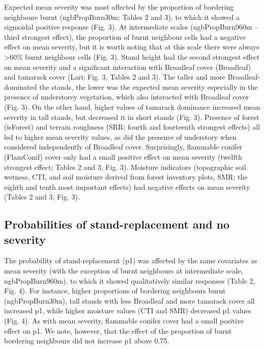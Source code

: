 \documentclass[
  numafflabel,
  authoryear,
  preprint]{elsarticle}
\begin{document}
Expected mean severity was most affected by the proportion of bordering
neighbours burnt (ngbPropBurn30m; Tables 2 and 3), to which it showed a
sigmoidal positive response (Fig. 3). At intermediate scales
(ngbPropBurn960m -- third strongest effect), the proportion of burnt
neighbour cells had a negative effect on mean severity, but it is worth
noting that at this scale there were always \textgreater60\% burnt
neighbour cells (Fig. 3). Stand height had the second strongest effect
on mean severity and a significant interaction with Broadleaf cover
(Broadleaf) and tamarack cover (Lari; Fig. 3, Tables 2 and 3). The
taller and more Broadleaf-dominated the stands, the lower was the
expected mean severity especially in the presence of understorey
vegetation, which also interacted with Broadleaf cover (Fig. 3). On the
other hand, higher values of tamarack dominance increased mean severity
in tall stands, but decreased it in short stands (Fig. 3). Presence of
forest (isForest) and terrain roughness (SRR; fourth and fourteenth
strongest effects) all led to higher mean severity values, as did the
presence of understory when considered independently of Broadleaf cover.
Surprisingly, flammable conifer (FlamConif) cover only had a small
positive effect on mean severity (twelfth strongest effect; Tables 2 and
3, Fig. 3). Moisture indicators (topographic soil wetness, CTI, and soil
moisture derived from forest inventory plots, SMR; the eighth and tenth
most important effects) had negative effects on mean severity (Tables 2
and 3, Fig. 3).

\subsection{Probabilities of stand-replacement and no
severity}\label{probabilities-of-stand-replacement-and-no-severity}

The probability of stand-replacement (p1) was affected by the same
covariates as mean severity (with the exception of burnt neighbours at
intermediate scale, ngbPropBurn960m), to which it showed qualitatively
similar responses (Table 2, Fig. 4). For instance, higher proportions of
bordering neighbours burnt (ngbPropBurn30m), tall stands with less
Broadleaf and more tamarack cover all increased p1, while higher
moisture values (CTI and SMR) decreased p1 values (Fig. 4). As with mean
severity, flammable conifer cover had a small positive effect on p1. We
note, however, that the effect of the proportion of burnt bordering
neighbours did not increase p1 above 0.75.
\end{document}
